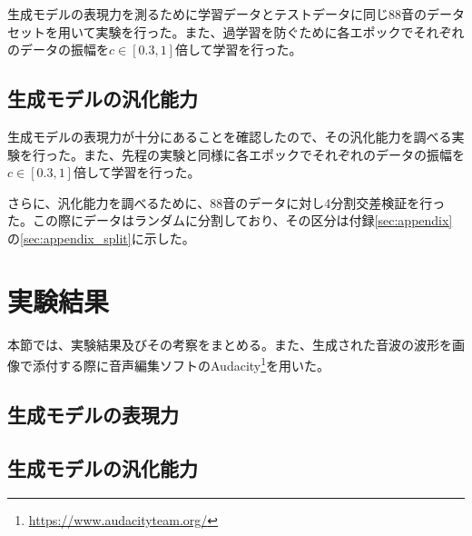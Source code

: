 生成モデルの表現力を測るために学習データとテストデータに同じ88音のデータセットを用いて実験を行った。また、過学習を防ぐために各エポックでそれぞれのデータの振幅を$c \in [0.3,1]$倍して学習を行った。

\subsection{生成モデルの汎化能力}

生成モデルの表現力が十分にあることを確認したので、その汎化能力を調べる実験を行った。また、先程の実験と同様に各エポックでそれぞれのデータの振幅を$c \in [0.3,1]$倍して学習を行った。

さらに、汎化能力を調べるために、88音のデータに対し4分割交差検証を行った。この際にデータはランダムに分割しており、その区分は付録\ref{sec:appendix}の\ref{sec:appendix_split}に示した。

\section{実験結果}

本節では、実験結果及びその考察をまとめる。また、生成された音波の波形を画像で添付する際に音声編集ソフトのAudacity\footnote{\url{https://www.audacityteam.org/}}を用いた。

\subsection{生成モデルの表現力}


\subsection{生成モデルの汎化能力}




